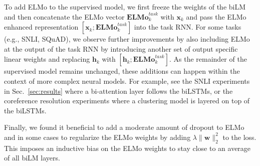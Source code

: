 \documentclass[11pt,a4paper]{article}
\newcommand{\ELMO}{ELMo}
\begin{document}
To add \ELMO{} to the supervised model, we first freeze the weights of the biLM and then concatenate the \ELMO{} vector $\mathbf{\ELMO}^{task}_k$ with $\mathbf{x}_k$ and pass the \ELMO{} enhanced representation $[\mathbf{x}_k; \mathbf{\ELMO}^{task}_k]$ into the task RNN.
For some tasks (e.g., SNLI, SQuAD), we observe further improvements by also including \ELMO{} at the output of the task RNN by introducing another set of output specific linear weights and replacing $\mathbf{h}_k$ with $[\mathbf{h}_k; \mathbf{\ELMO}^{task}_k]$.
As the remainder of the supervised model remains unchanged, these additions can happen within the context of more complex neural models.
For example, see the SNLI experiments in Sec.~\ref{sec:results} where a bi-attention layer follows the biLSTMs, or the coreference resolution experiments where a clustering model is layered on top of the biLSTMs. %

Finally, we found it beneficial to add a moderate amount of dropout to \ELMO{} \citep{Srivastava2014DropoutAS} and in some cases to regularize the \ELMO{} weights by
adding
$\lambda \lVert \mathbf{w} \rVert_2^2$ to the loss.
This imposes an inductive bias on the \ELMO{} weights to stay close to an average of all biLM layers.
\end{document}
